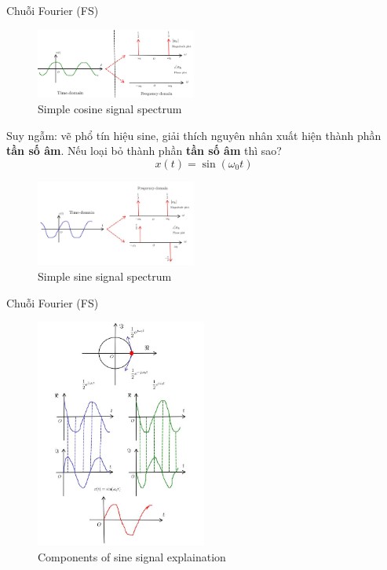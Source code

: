 \documentclass[8pt]{beamer}
\begin{document}
\begin{frame}{Chuỗi Fourier (FS)}
\begin{figure}[h]
			\includegraphics[width=0.47\textwidth]{fre.jpg}
			\caption{Simple cosine signal spectrum}\label{fig:re11}

		\end{figure}

		Suy ngẫm: vẽ phổ tín hiệu sine, giải thích nguyên nhân xuất hiện thành phần \textbf{tần số âm}. Nếu loại bỏ thành phần \textbf{tần số âm} thì sao? 
$$x(t)=\sin{(\omega_{0}t)}$$
\begin{figure}[h]
			\includegraphics[width=0.47\textwidth]{sine.jpg}
			\caption{Simple sine signal spectrum}\label{fig:re11}

		\end{figure}


\end{frame}
\begin{frame}{Chuỗi Fourier (FS)}

\begin{figure}[h]
			\includegraphics[width=0.5\textwidth]{sin.jpg}
			\caption{Components of sine signal explaination}\label{fig:re11}

		\end{figure}
\end{frame}
\end{document}
